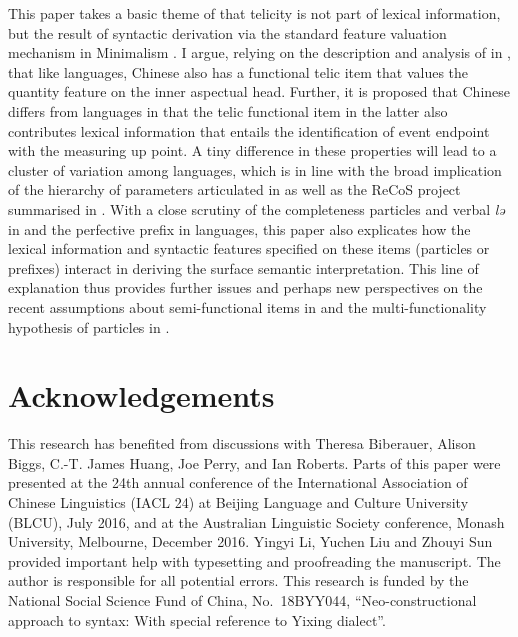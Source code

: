 \documentclass[output=paper]{langsci/langscibook}
\begin{document}
This paper takes a basic theme of \textcite{Borer2005b} that telicity is not
part of lexical information, but the result of syntactic derivation via the
standard feature valuation mechanism in Minimalism
\citep{Chomsky2000,Chomsky2001}. I argue, relying on the description and
analysis of  in \textcite{Huxuhui2016}, that like
languages, Chinese also has a functional telic item that values the quantity
feature on the inner aspectual head.  Further, it is proposed
that Chinese differs from  languages in that the telic functional item in
the latter also contributes lexical information that entails the identification
of event endpoint with the measuring up point. A tiny difference in these
properties will lead to a cluster of variation among languages, which is in
line with the broad implication of the hierarchy of parameters articulated in \textcite{RobHol2010} as well as the ReCoS project
summarised in \textcite{robertsonline}. With a close scrutiny of the
completeness particles and verbal \emph{lə} in  and the
perfective prefix in  languages, this paper also explicates how the
lexical information and syntactic features specified on these items (particles
or prefixes) interact in deriving the surface semantic interpretation. This
line of explanation thus provides further issues and perhaps new perspectives
on the recent assumptions about semi-functional items in
\textcite{huang2015syntactic} and the multi-functionality hypothesis of
particles in \textcite{Biberauer2017,Biberauer2017c}.


\pagebreak
\printchapterglossary{}

\section*{Acknowledgements}\largerpage

This research has benefited from discussions with Theresa Biberauer, Alison
Biggs, C.-T. James Huang, Joe Perry, and Ian Roberts. Parts of this paper were
presented at the 24th annual conference of the International Association of Chinese
Linguistics (IACL 24) at Beijing Language and Culture University (BLCU), July
2016, and at the Australian Linguistic Society conference, Monash University,
Melbourne, December 2016. Yingyi Li, Yuchen Liu and Zhouyi Sun provided
important help with typesetting and proofreading the manuscript. The
author is responsible for all potential errors. This research is funded by
the National Social Science Fund of China, No.\ 18BYY044,
\enquote{Neo-constructional approach to syntax: With special reference to
Yixing dialect}.

{\sloppy\printbibliography[heading=subbibliography,notkeyword=this]}
\end{document}
